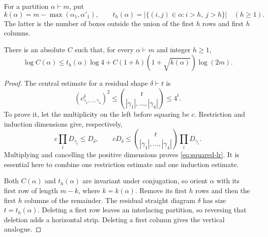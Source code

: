 For a partition $\alpha\vdash m$, put
\[
 k(\alpha)=m-\max(\alpha_1,\alpha'_1),\qquad
 t_h(\alpha)=|\{(i,j)\in\alpha:i>h,\ j>h\}|\quad(h\ge1).
\]
The latter is the number of boxes outside the union of the first $h$ rows and first $h$ columns.

\begin{lemma}\label{lem:restriction-cost}
There is an absolute $C$ such that, for every $\alpha\vdash m$ and integer $h\ge1$,
\begin{equation}\label{eq:restriction-cost}
 \log C(\alpha)\le t_h(\alpha)\log4
       +C(1+h)(1+\sqrt{k(\alpha)})\log(2m).
\end{equation}
\end{lemma}
\begin{proof}
The central estimate for a residual shape $\delta\vdash t$ is
\begin{equation}\label{eq:squared-lr}
 (c^{\delta}_{\gamma_1,\ldots,\gamma_4})^2
 \le\binom{t}{|\gamma_1|,\ldots,|\gamma_4|}\le4^t.
\end{equation}
To prove it, let the multiplicity on the left before squaring be $c$. Restriction and induction dimensions give, respectively,
\[
 c\prod_iD_{\gamma_i}\le D_\delta,
 \qquad
 cD_\delta\le
 \binom{t}{|\gamma_1|,\ldots,|\gamma_4|}\prod_iD_{\gamma_i}.
\]
Multiplying and cancelling the positive dimensions proves \eqref{eq:squared-lr}. It is essential here to combine one restriction estimate and one induction estimate.

Both $C(\alpha)$ and $t_h(\alpha)$ are invariant under conjugation, so orient $\alpha$ with its first row of length $m-k$, where $k=k(\alpha)$. Remove its first $h$ rows and then the first $h$ columns of the remainder. The residual straight diagram $\delta$ has size $t=t_h(\alpha)$. Deleting a first row leaves an interlacing partition, so reversing that deletion adds a horizontal strip. Deleting a first column gives the vertical analogue.


\end{proof}
